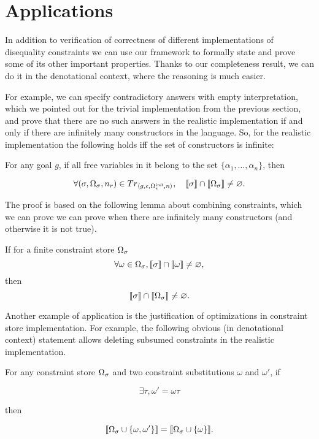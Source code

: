 \section{Applications}
\label{sec:applications}

In addition to verification of correctness of different implementations of disequality constraints we can use our framework to formally
state and prove some of its other important properties. Thanks to our completeness result, we can do it in the denotational context,
where the reasoning is much easier.

For example, we can specify contradictory answers with empty interpretation, which we pointed out for the trivial implementation from the previous section,
and prove that there are no such answers in the realistic implementation if and only if there are infinitely many constructors in the language. So, for the realistic implementation the following holds iff the set of constructors is infinite:

\begin{lemma}
For any goal $g$, if all free variables in it belong to the set $\{\alpha_1,\dots,\alpha_n\}$, then

\[ \forall (\sigma, \Omega_\sigma, n_r) \in Tr_{\left<{g, \epsilon, \Omega_\epsilon^{\mathit{init}}, n}\right>}, \quad \llbracket{\sigma}\rrbracket \cap \llbracket{\Omega_\sigma}\rrbracket \neq \varnothing. \]
\end{lemma}

The proof is based on the following lemma about combining constraints, which we can prove we can prove when there are infinitely many constructors (and otherwise it is not true).

\begin{lemma}
If for a finite constraint store $\Omega_\sigma$
\[ \forall \omega \in \Omega_\sigma,  \llbracket{\sigma}\rrbracket \cap \llbracket{\omega}\rrbracket \neq \varnothing, \]
then
\[ \llbracket{\sigma}\rrbracket \cap \llbracket{\Omega_\sigma}\rrbracket \neq \varnothing. \]
\end{lemma}

Another example of application is the justification of optimizations in constraint store implementation. For example, the following obvious (in denotational context) statement
allows deleting subsumed constraints in the realistic implementation.

\begin{lemma}
For any constraint store $\Omega_\sigma$ and two constraint substitutions $\omega$ and $\omega'$, if

\[ \exists \tau, \omega' = \omega \tau \]

then

\[ \llbracket{\Omega_\sigma \cup \{\omega, \omega'\}}\rrbracket = \llbracket{\Omega_\sigma \cup \{\omega\}}\rrbracket. \]
\end{lemma}
